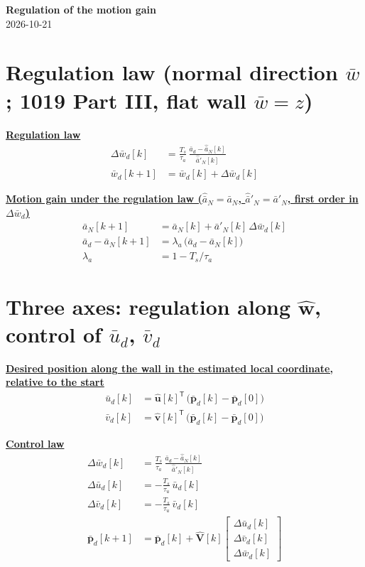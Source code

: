 \documentclass[11pt,a4paper]{ctexart}
\newcommand{\ba}{\bar{a}}
\newcommand{\bw}{\bar{w}}
\newcommand{\hd}[1]{\par\bigskip\noindent\underline{\textbf{#1}}}
\begin{document}
\begin{center}
{\Large\textbf{Regulation of the motion gain}}\\[0.4em]{\small 2026-10-21}
\end{center}

\section{Regulation law (normal direction $\bw$; 1019 Part III, flat wall $\bw = z$)}

\hd{Regulation law}
\[
\begin{aligned}
\Delta\bw_d[k] &= \frac{T_s}{\tau_a}\,\frac{\ba_d - \hat{\ba}_N[k]}{\hat{\ba}'_N[k]} \\
\bw_d[k+1] &= \bw_d[k] + \Delta\bw_d[k]
\end{aligned}
\]

\hd{Motion gain under the regulation law ($\hat{\ba}_N = \ba_N$, $\hat{\ba}'_N = \ba'_N$, first order in $\Delta\bw_d$)}
\[
\begin{aligned}
\ba_N[k+1] &= \ba_N[k] + \ba'_N[k]\,\Delta\bw_d[k] \\
\ba_d - \ba_N[k+1] &= \lambda_a\,\big(\ba_d - \ba_N[k]\big) \\
\lambda_a &= 1 - T_s/\tau_a
\end{aligned}
\]

\section{Three axes: regulation along $\hat{\mathbf{w}}$, control of $\bar{u}_d$, $\bar{v}_d$}

\hd{Desired position along the wall in the estimated local coordinate, relative to the start}
\[
\begin{aligned}
\bar{u}_d[k] &= \hat{\mathbf{u}}[k]^{\mathsf{T}}\,\big(\bar{\mathbf{p}}_d[k] - \bar{\mathbf{p}}_d[0]\big) \\
\bar{v}_d[k] &= \hat{\mathbf{v}}[k]^{\mathsf{T}}\,\big(\bar{\mathbf{p}}_d[k] - \bar{\mathbf{p}}_d[0]\big)
\end{aligned}
\]

\hd{Control law}
\[
\begin{aligned}
\Delta\bw_d[k] &= \frac{T_s}{\tau_a}\,\frac{\ba_d - \hat{\ba}_N[k]}{\hat{\ba}'_N[k]} \\
\Delta\bar{u}_d[k] &= -\frac{T_s}{\tau_u}\,\bar{u}_d[k] \\
\Delta\bar{v}_d[k] &= -\frac{T_s}{\tau_u}\,\bar{v}_d[k] \\
\bar{\mathbf{p}}_d[k+1] &= \bar{\mathbf{p}}_d[k] + \hat{\mathbf{V}}[k] \begin{bmatrix} \Delta\bar{u}_d[k] \\ \Delta\bar{v}_d[k] \\ \Delta\bw_d[k] \end{bmatrix}
\end{aligned}
\]
\end{document}
